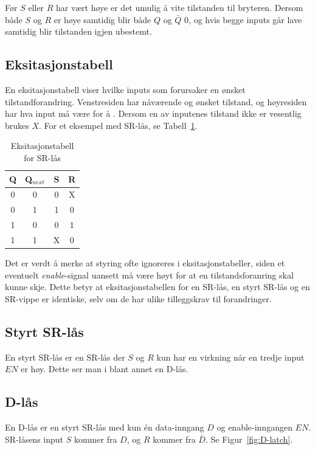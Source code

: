 \documentclass[12pt,a4paper,norsk]{article}
\begin{document}
Før $S$ eller $R$ har vært høye er det umulig å vite tilstanden til bryteren.
Dersom både $S$ og $R$ er høye samtidig blir både $Q$ og $\bar{Q}$ $0$, og hvis begge
inputs går lave samtidig blir tilstanden igjen ubestemt.

\subsection{Eksitasjonstabell}
En eksitasjonstabell viser hvilke inputs som forursaker en ønsket
tilstandforandring. Venstresiden har nåværende og ønsket tilstand, og høyresiden
har hva input må være for å . Dersom en av inputenes tilstand ikke er vesentlig brukes $X$. For
et eksempel med SR-lås, se Tabell~\ref{tab:SR_latch_eksit}.

\begin{table}[hbt!]
  \centering
  \begin{tabular}{cc|cc}
    \toprule
    Q & Q$_{next}$ & S & R \\
    \midrule
    0 & 0 & 0 & X \\
    0 & 1 & 1 & 0 \\
    1 & 0 & 0 & 1 \\
    1 & 1 & X & 0
  \end{tabular}
  \caption{Eksitasjonstabell for SR-lås\label{tab:SR_latch_eksit}}
\end{table}

Det er verdt å merke at styring ofte ignoreres i eksitasjonstabeller, siden et
eventuelt \textit{enable}-signal uansett må være høyt for at en
tilstandsforanring skal kunne skje. Dette betyr at eksitasjonstabellen for en
SR-lås, en styrt SR-lås og en SR-vippe er identiske, selv om de har ulike
tilleggskrav til forandringer. 

\subsection{Styrt SR-lås}
En styrt SR-lås er en SR-lås der $S$ og $R$ kun har en virkning når en tredje
input $EN$ er høy. Dette ser man i blant annet en D-lås.

\subsection{D-lås}
En D-lås er en styrt SR-lås med kun én data-inngang $D$ og enable-inngangen
$EN$. SR-låsens input $S$ kommer fra $D$, og $R$ kommer
fra $\bar{D}$. Se Figur~\ref{fig:D-latch}.
\end{document}
